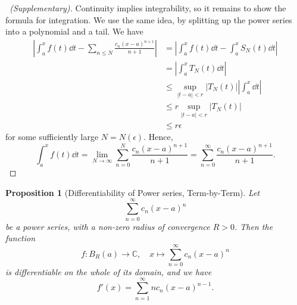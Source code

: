 \documentclass[11pt]{article}
\numberwithin{equation}{section}
\newtheorem{proposition}[theorem]{Proposition}
\theoremstyle{definition}
\theoremstyle{remark}
\newcommand{\pqty}[1]{\left(#1\right)}
\newcommand{\abs}[1]{\left|#1\right|}
\newcommand{\function}[5]{#1:#2\to #3,\quad #4\mapsto #5}
\newcommand{\CC}{\mathbb C}
\begin{document}
\begin{proof}[\proofname\ (Supplementary)]
    Continuity implies integrability, so it remains to show the formula for integration. We use the same idea, by splitting up the power series into a polynomial and a tail. We have
    \begin{align*}
        \abs{\int_{a}^{x} f\pqty{t} \dd{t} - \sum_{n \leq N} \frac{c_n \pqty{x - a}^{n + 1}}{n + 1}} &= \abs{\int_{a}^{x} f\pqty{t} \dd{t} - \int_{a}^{x} S_N\pqty{t} \dd{t}} \\
        &= \abs{\int_{a}^{x} T_N\pqty{t} \dd{t}} \\
        &\leq \sup_{\abs{t - a} < r} \abs{T_N \pqty{t}} \abs{\int_{a}^{x} \dd{t}} \\
        &\leq r \sup_{\abs{t - a} < r} \abs{T_N \pqty{t}} \\
        &\leq r \epsilon
    \end{align*}
    for some sufficiently large \(N = N\pqty{\epsilon}\). Hence,
    \[
        \int_{a}^{x} f\pqty{t} \dd{t} = \lim_{N \to \infty} \sum_{n = 0}^{N} \frac{c_n \pqty{x - a}^{n + 1}}{n + 1} = \sum_{n = 0}^{\infty} \frac{c_n \pqty{x - a}^{n + 1}}{n + 1}.
    \]
\end{proof}

\begin{proposition}[Differentiability of Power series, Term-by-Term]\label{analysis-unit-0215}
    \label{prop:differentiability-of-power-series-term-by-term}%
    Let
    \[
        \sum_{n = 0}^{\infty} c_n \pqty{x - a}^{n}
    \]
    be a power series, with a non-zero radius of convergence \(R > 0\). Then the function
    \[
        \function{f}{B_R \pqty{a}}{\CC}{x}{\sum_{n = 0}^{\infty} c_n \pqty{x - a}^n}
    \]
    is differentiable on the whole of its domain, and we have
    \[
        f'\pqty{x} = \sum_{n = 1}^{\infty} n c_n \pqty{x - a}^{n - 1}.
    \]
\end{proposition}
\end{document}
